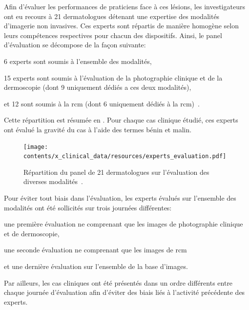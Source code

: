 Afin d'évaluer les performances de praticiens face à ces lésions, les investigateurs ont eu recours à 21 dermatologues détenant une expertise des modalités d'imagerie non invasives. Ces experts sont répartis de manière homogène selon leurs compétences respectives pour chacun des dispositifs. Ainsi, le panel d'évaluation se décompose de la façon suivante: 
\begin{inlinerate}
\item 6 experts sont soumis à l'ensemble des modalités,
\item 15 experts sont soumis à l'évaluation de la photographie clinique et de la dermoscopie (dont 9 uniquement dédiés a ces deux modalités),
\item et 12 sont soumis à la \gls{rcm} (dont 6 uniquement dédiés à la \gls{rcm})~\cite{Cinotti2018}.
\end{inlinerate}
Cette répartition est résumée en . Pour chaque cas clinique étudié, ces experts ont évalué la gravité du cas à l'aide des termes bénin et malin.\par

\begin{figure}[H]
    \centering
    \texttt{[image: contents/x\_clinical\_data/resources/experts\_evaluation.pdf]}
    \caption{Répartition du panel de 21 dermatologues sur l'évaluation des diverses modalités~\cite{Cinotti2018}.}
    \label{fig:experts_evaluation}
\end{figure}\par

Pour éviter tout biais dans l'évaluation, les experts évalués sur l'ensemble des modalités ont été sollicités sur trois journées différentes: 
\begin{inlinerate}
\item une première évaluation ne comprenant que les images de photographie clinique et de dermoscopie,
\item une seconde évaluation ne comprenant que les images de \gls{rcm}
\item et une dernière évaluation sur l'ensemble de la base d'images.
\end{inlinerate}
Par ailleurs, les cas cliniques ont été présentés dans un ordre différents entre chaque journée d'évaluation afin d'éviter des biais liés à l'activité précédente des experts.\par


